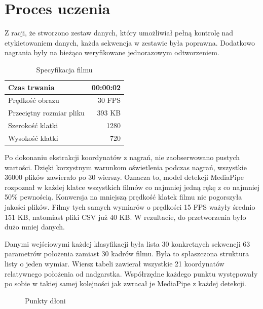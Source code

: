 \section{Proces uczenia}
\label{sec:training-process}

Z racji, że stworzono zestaw danych, który umożliwiał pełną kontrolę nad etykietowaniem danych, każda sekwencja w zestawie była poprawna. Dodatkowo nagrania były na bieżąco weryfikowane jednorazowym odtworzeniem.

\begin{table}[H]
    \centering
    \small
    \begin{tabular}[c]{|l|r|}
        \hline
        Czas trwania             & 00:00:02 \\ \hline
        Prędkość obrazu          & 30 FPS   \\ \hline
        Przeciętny rozmiar pliku & 393 KB   \\ \hline
        Szerokość klatki         & 1280     \\ \hline
        Wysokość klatki          & 720      \\ \hline
    \end{tabular}
    \caption{Specyfikacja filmu}
    \label{tab:film-specs}
\end{table}

Po dokonaniu ekstrakcji koordynatów z nagrań, nie zaobserwowano pustych wartości. Dzięki korzystnym warunkom oświetlenia podczas nagrań, wszystkie 36000 plików zawierało po 30 wierszy. Oznacza to, model detekcji MediaPipe rozpoznał w każdej klatce wszystkich filmów co najmniej jedną rękę z co najmniej 50\% pewnością. Konwersja na mniejszą prędkość klatek filmu nie pogorszyła jakości plików. Filmy tych samych wymiarów o prędkości 15 FPS ważyły średnio 151 KB, natomiast pliki CSV już 40 KB. W rezultacie, do przetworzenia było dużo mniej danych.

Danymi wejściowymi każdej klasyfikacji była lista 30 konkretnych sekwencji 63 parametrów położenia zamiast 30 kadrów filmu. Była to spłaszczona struktura listy o jeden wymiar. Wiersz tabeli zawierał wszystkie 21 koordynatów relatywnego położenia od nadgarstka. Współrzędne każdego punktu występowały po sobie w takiej samej kolejności jak zwracał je MediaPipe z każdej detekcji.

\begin{figure}[H]
    \centering
    
    \caption{Punkty dłoni}
    \label{fig:hand-landmarks-mp}
\end{figure}

